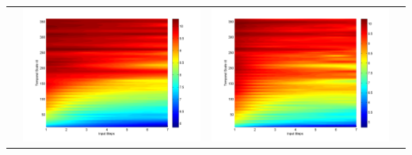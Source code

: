 \documentclass[11pt]{article}
\begin{document}
\begin{table}[H]
{\begin{tabular}{cccc}
&\begin{minipage}{.3\textwidth}\includegraphics[width=\linewidth]{resultgraph/AU/11532500p_abs.png}\end{minipage}
&\begin{minipage}{.3\textwidth}\includegraphics[width=\linewidth]{resultgraph/AU/11532500pep_abs.png}\end{minipage}

\end{tabular}}
\end{table}
\end{document}
